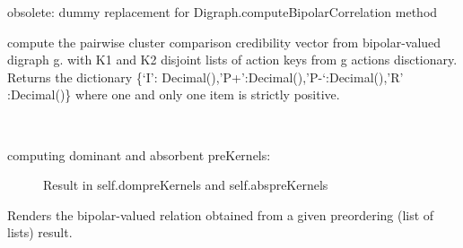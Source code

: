 \documentclass[letterpaper,10pt,english]{sphinxmanual}
\begin{document}
\begin{fulllineitems}
\begin{fulllineitems}
\end{fulllineitems}


\begin{fulllineitems}
\label{techDoc:digraphs.Digraph.computeOrdinalCorrelation}
obsolete: dummy replacement for Digraph.computeBipolarCorrelation method

\end{fulllineitems}


\begin{fulllineitems}
\label{techDoc:digraphs.Digraph.computePairwiseClusterComparison}
compute the pairwise cluster comparison credibility vector
from bipolar-valued digraph g. with K1 and K2 disjoint
lists of action keys from g actions disctionary.
Returns the dictionary
\{`I': Decimal(),'P+':Decimal(),'P-`:Decimal(),'R' :Decimal()\}
where one and only one item is strictly positive.

\end{fulllineitems}


\begin{fulllineitems}
\label{techDoc:digraphs.Digraph.computePreKernels}~\begin{description}
\item[{computing dominant and absorbent preKernels:}] \leavevmode
Result in self.dompreKernels and self.abspreKernels

\end{description}

\end{fulllineitems}


\begin{fulllineitems}
\label{techDoc:digraphs.Digraph.computePreorderRelation}
Renders the bipolar-valued relation obtained from
a given preordering (list of lists) result.


\end{fulllineitems}
\end{fulllineitems}
\end{document}
